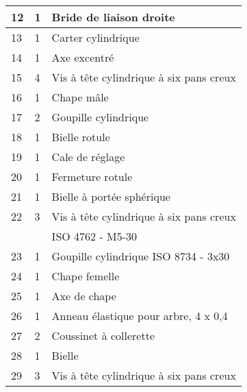 \begin{center}
\begin{tabular}{|l|l|l|}
12&
1&
Bride de liaison droite \\ \hline %
13&
1&
Carter cylindrique\\ \hline %
14&
1&
Axe excentré \\ \hline %
15&
4&
Vis à tête cylindrique à six pans creux\\ \hline %
16&
1&
Chape mâle\\ \hline %
17&
2&
Goupille cylindrique \\ \hline %
18&
1&
Bielle rotule \\ \hline %
19&
1&
Cale de réglage \\ \hline %
20&
1&
Fermeture rotule \\ \hline %
21&
1&
Bielle à portée sphérique \\ \hline %
22&
3&
Vis à tête cylindrique à six pans creux  \\
&& ISO 4762 - M5-30 \\ \hline %
23&
1&
Goupille cylindrique ISO 8734 - 3x30  \\ \hline %
24&
1&
Chape femelle \\ \hline %
25&
1&
Axe de chape \\ \hline %
26&
1&
Anneau élastique pour arbre, 4 x 0,4 \\ \hline %
27&
2&
Coussinet à collerette \\ \hline %
28&
1&
Bielle \\ \hline %
29&
3&
Vis à tête cylindrique à six pans creux \\ \hline %

\end{tabular}
\end{center}
